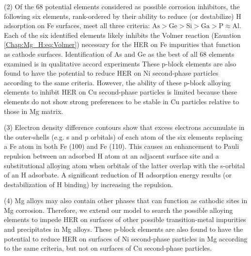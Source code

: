 (2) Of the 68 potential elements considered as possible corrosion inhibitors, the following six elements, rank-ordered by their ability to reduce (or destabilize) H adsorption on Fe surfaces, meet all three criteria: $\text{As} > \text{Ge} > \text{Si} > \text{Ga} > \text{P} \approx \text{Al}$. Each of the six identified elements likely inhibits the Volmer reaction (Eauation \ref{Chap:Mg_H:eq:Volmer}) necessary for the \ac{HER} on Fe impurities that function as cathode surfaces. Identification of As and Ge as the best of all 68 elements examined is in qualitative accord experiments These p-block elements are also found to have the potential to reduce \ac{HER} on Ni second-phase particles according to the same criteria. However, the ability of these p-block alloying elements to inhibit \ac{HER} on Cu second-phase particles is limited because these elements do not show strong preferences to be stable in Cu particles relative to those in Mg matrix.

(3) Electron density difference contours show that excess electrons accumulate in the outer-shells (e.g. s and p orbitals) of each atom of the six elements replacing a Fe atom in both Fe (100) and Fe (110). This causes an enhancement to Pauli repulsion between an adsorbed H atom at an adjacent surface site and a substitutional alloying atom when orbitals of the latter overlap with the s-orbital of an H adsorbate. A significant reduction of H adsorption energy results (or destabilization of H binding) by increasing the repulsion.

(4) Mg alloys may also contain other phases that can function as cathodic sites in Mg corrosion. Therefore, we extend our model to search the possible alloying elements to impede \ac{HER} on surfaces of other possible transition-metal impurities and precipitates in Mg alloys. These p-block elements are also found to have the potential to reduce \ac{HER} on surfaces of Ni second-phase particles in Mg according to the same criteria, but not on surfaces of Cu second-phase particles. 